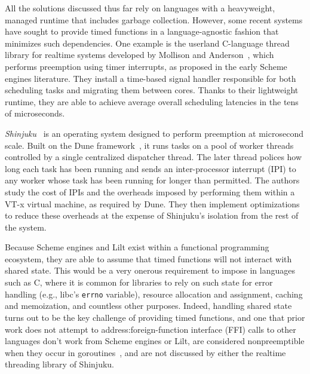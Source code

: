 All the solutions discussed thus far rely on languages with a heavyweight, managed
runtime that includes garbage collection.  However, some recent systems have sought
to provide timed functions in a language-agnostic fashion that minimizes such
dependencies.  One example is the userland C-language thread library for realtime
systems developed by Mollison and Anderson~\cite{mollison:rtas2013}, which performs
preemption using timer interrupts, as proposed in the early Scheme engines
literature.  They install a time-based signal handler responsible for both scheduling
tasks and migrating them between cores.  Thanks to their lightweight runtime, they
are able to achieve average overall scheduling latencies in the tens of microseconds.

\textit{Shinjuku}~\cite{Kaffes:nsdi2019} is an operating system designed to perform
preemption at microsecond scale.  Built on the Dune framework~\cite{Belay:osdi2012},
it runs tasks on a pool of worker threads controlled by a single centralized
dispatcher thread.  The later thread polices how long each task has been running and
sends an inter-processor interrupt (IPI) to any worker whose task has been running
for longer than permitted.  The authors study the cost of IPIs and the overheads
imposed by performing them within a VT-x virtual machine, as required by Dune.  They
then implement optimizations to reduce these overheads at the expense of Shinjuku's
isolation from the rest of the system.

Because Scheme engines and Lilt exist within a functional programming ecosystem, they
are able to assume that timed functions will not interact with shared state.  This
would be a very onerous requirement to impose in languages such as C, where it is
common for libraries to rely on such state for error handling (e.g., libc's
\texttt{errno} variable), resource allocation and assignment, caching and
memoization, and countless other purposes.  Indeed, handling shared state turns out
to be the key challenge of providing timed functions, and one that prior work does
not attempt to address:\@ foreign-function interface (FFI) calls to other languages
don't work from Scheme engines or Lilt, are considered nonpreemptible when they
occur in goroutines~\cite{www-golang-fficall}, and are not discussed by either the
realtime threading library of Shinjuku.

